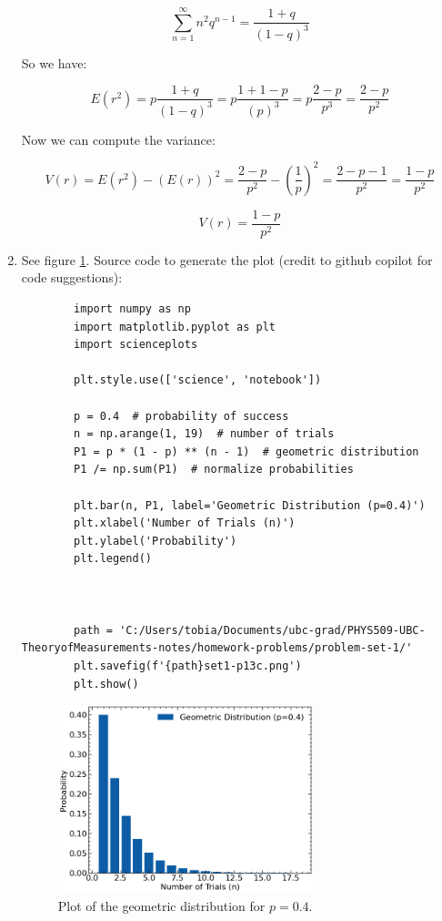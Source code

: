 \documentclass[10pt]{article}
\begin{document}
\begin{enumerate}[label=(\alph*)]
	      \[ \sum_{n=1}^{\infty} n^2 q^{n-1} = \frac{1+q}{(1-q)^3} \]

	      So we have:

	      \[ E(r^2) = p \frac{1+q}{(1-q)^3} = p \frac{1 + 1 - p}{(p)^3} = p \frac{2 - p}{p^3} = \frac{2 - p}{p^2} \]

	      Now we can compute the variance:

	      \[ V(r) = E(r^2) - (E(r))^2 = \frac{2 - p}{p^2} - \left(\frac{1}{p}\right)^2 = \frac{2 - p - 1}{p^2} = \frac{1 - p}{p^2} \]

	      \[ \boxed{V(r) = \frac{1 - p}{p^2}} \]


	\item See figure \ref{fig:geometric}. Source code to generate the plot (credit to github copilot for code suggestions):


	      \begin{verbatim}
		import numpy as np
		import matplotlib.pyplot as plt
		import scienceplots

		plt.style.use(['science', 'notebook'])

		p = 0.4  # probability of success
		n = np.arange(1, 19)  # number of trials
		P1 = p * (1 - p) ** (n - 1)  # geometric distribution
		P1 /= np.sum(P1)  # normalize probabilities

		plt.bar(n, P1, label='Geometric Distribution (p=0.4)')
		plt.xlabel('Number of Trials (n)')
		plt.ylabel('Probability')
		plt.legend()



		path = 'C:/Users/tobia/Documents/ubc-grad/PHYS509-UBC-TheoryofMeasurements-notes/homework-problems/problem-set-1/'
		plt.savefig(f'{path}set1-p13c.png')
		plt.show()
	\end{verbatim}

	      \begin{figure}[h]
		      \centering
		      \includegraphics[width=0.7\textwidth]{set1-p13c.png}
		      \caption{Plot of the geometric distribution for $p=0.4$.}
		      \label{fig:geometric}
	      \end{figure}



\end{enumerate}
\end{document}
